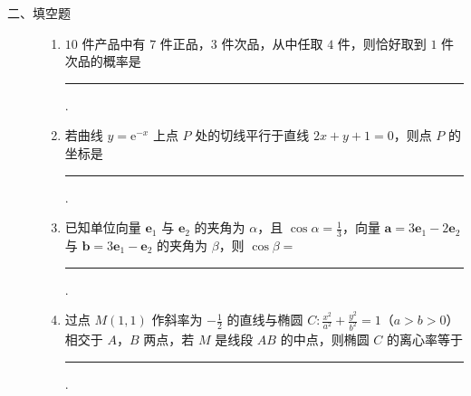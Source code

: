 \begin{description}

    \item[二、填空题]

    \begin{enumerate}[leftmargin=5pt]

      \addtocounter{enumi}{+12}

        \item \(10\) 件产品中有 \(7\) 件正品，\(3\) 件次品，从中任取 \(4\) 件，则恰好取到 \(1\) 件次品的概率是\rule[-0.3ex]{3em}{0.4pt}.

        \item 若曲线 \( y = {\mathrm{e}}^{-x} \) 上点 \(P\) 处的切线平行于直线 \( 2x + y + 1 = 0 \)，则点 \(P\) 的坐标是\rule[-0.3ex]{3em}{0.4pt}.

        \item 已知单位向量 \(\bm{e}_1\) 与 \(\bm{e}_2\) 的夹角为 \(\alpha\)，且 \(\cos \alpha = \frac{1}{3}\)，向量 \(\bm{a} = 3\bm{e}_1 - 2\bm{e}_2\) 与 \(\bm{b} = 3\bm{e}_1 - \bm{e}_2\) 的夹角为 \(\beta\)，则 \(\cos \beta =\)\rule[-0.3ex]{3em}{0.4pt}.

        \item 过点 \(M(1,1)\) 作斜率为 \(-\frac{1}{2}\) 的直线与椭圆 \(C: \frac{x^2}{a^2} + \frac{y^2}{b^2} = 1\)（\(a > b > 0\)）相交于 \(A\)，\(B\) 两点，若 \(M\) 是线段 \(AB\) 的中点，则椭圆 \(C\) 的离心率等于\rule[-0.3ex]{3em}{0.4pt}.

    \end{enumerate}

\end{description}

